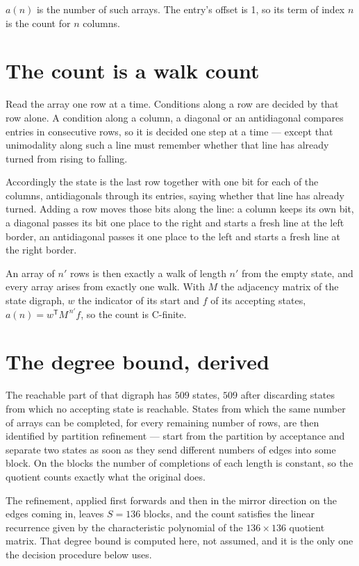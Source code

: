 \documentclass[11pt]{article}
\theoremstyle{definition}
\begin{document}
$a(n)$ is the number of such arrays. The entry's offset is 1, so its term of index $n$ is the count for $n$ columns.

\section{The count is a walk count}

Read the array one row at a time. Conditions along a row are decided by that row alone. A condition along a column, a diagonal or an antidiagonal compares entries in consecutive rows, so it is decided one step at a time --- except that unimodality along such a line must remember whether that line has already turned from rising to falling.

Accordingly the state is the last row together with one bit for each of the columns, antidiagonals through its entries, saying whether that line has already turned. Adding a row moves those bits along the line: a column keeps its own bit, a diagonal passes its bit one place to the right and starts a fresh line at the left border, an antidiagonal passes it one place to the left and starts a fresh line at the right border.

An array of $n'$ rows is then exactly a walk of length $n'$ from the empty state, and every array arises from exactly one walk. With $M$ the adjacency matrix of the state digraph, $w$ the indicator of its start and $f$ of its accepting states, $a(n) = w^{\mathsf T}M^{\,n'}f$, so the count is C-finite.

\section{The degree bound, derived}

The reachable part of that digraph has $509$ states, $509$ after discarding states from which no accepting state is reachable. States from which the same number of arrays can be completed, for every remaining number of rows, are then identified by partition refinement --- start from the partition by acceptance and separate two states as soon as they send different numbers of edges into some block. On the blocks the number of completions of each length is constant, so the quotient counts exactly what the original does.

The refinement, applied first forwards and then in the mirror direction on the edges coming in, leaves $S = 136$ blocks, and the count satisfies the linear recurrence given by the characteristic polynomial of the $136 \times 136$ quotient matrix. That degree bound is computed here, not assumed, and it is the only one the decision procedure below uses.
\end{document}
